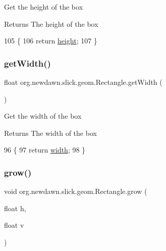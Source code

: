 Get the height of the box

\begin{DoxyReturn}{Returns}
The height of the box 
\end{DoxyReturn}

\begin{DoxyCode}
105                              \{
106         \textcolor{keywordflow}{return} \mbox{\hyperlink{classorg_1_1newdawn_1_1slick_1_1geom_1_1_rectangle_a3bd010fdce636fc11ed0e0ad4d4b4a0a}{height}};
107     \}
\end{DoxyCode}
\mbox{\label{classorg_1_1newdawn_1_1slick_1_1geom_1_1_rectangle_ae2fddc33461303a9ccf8854c1e93c9c1}} 
\subsubsection{\texorpdfstring{get\+Width()}{getWidth()}}
{\footnotesize\ttfamily float org.\+newdawn.\+slick.\+geom.\+Rectangle.\+get\+Width (\begin{DoxyParamCaption}{ }\end{DoxyParamCaption})\hspace{0.3cm}{\ttfamily [inline]}}

Get the width of the box

\begin{DoxyReturn}{Returns}
The width of the box 
\end{DoxyReturn}

\begin{DoxyCode}
96                             \{
97         \textcolor{keywordflow}{return} \mbox{\hyperlink{classorg_1_1newdawn_1_1slick_1_1geom_1_1_rectangle_a967e1823f62daf45abb142779d1be62d}{width}};
98     \}
\end{DoxyCode}
\mbox{\label{classorg_1_1newdawn_1_1slick_1_1geom_1_1_rectangle_a0d5625456b48b72e4b09514d597edcf4}} 
\subsubsection{\texorpdfstring{grow()}{grow()}}
{\footnotesize\ttfamily void org.\+newdawn.\+slick.\+geom.\+Rectangle.\+grow (\begin{DoxyParamCaption}\item[{float}]{h,  }\item[{float}]{v }\end{DoxyParamCaption})\hspace{0.3cm}{\ttfamily [inline]}}

